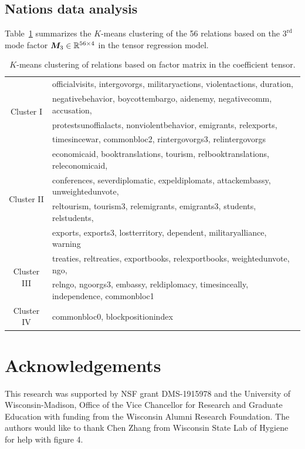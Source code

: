 \documentclass[12pt]{article}
\theoremstyle{plain}
\theoremstyle{definition}
\begin{document}
\subsection{Nations data analysis}
Table~\ref{tab:s1} summarizes the $K$-means clustering of the 56 relations based on the $3^{\text{rd}}$ mode factor $\bm M_3\in\mathbb{R}^{56\times 4}$ in the tensor regression model. 

\begin{table}[H]
\begin{tabular}{c|l}
\hline
\multirow{4}{*}{Cluster I}  &officialvisits, intergovorgs,  militaryactions, violentactions, duration, \\
&negativebehavior, boycottembargo, aidenemy, negativecomm, accusation, \\
& protestsunoffialacts,    nonviolentbehavior, emigrants, relexports,   \\
& timesincewar, commonbloc2, rintergovorgs3, relintergovorgs\\
\hline
\multirow{4}{*}{Cluster II}& economicaid, booktranslations, tourism, relbooktranslations, releconomicaid, \\
& conferences, severdiplomatic, expeldiplomats, attackembassy, unweightedunvote,\\
& reltourism, tourism3, relemigrants, emigrants3, students, relstudents, \\
&exports, exports3, lostterritory, dependent, militaryalliance, warning  \\
\hline
\multirow{2}{*}{Cluster III} & treaties, reltreaties, exportbooks, relexportbooks, weightedunvote, ngo, \\
&relngo, ngoorgs3, embassy, reldiplomacy, timesinceally, independence, commonbloc1\\
\hline
Cluster IV & commonbloc0, blockpositionindex\\
\end{tabular}
\caption{$K$-means clustering of relations based on factor matrix in the coefficient tensor.}\label{tab:s1}
\end{table}

\section*{Acknowledgements}
This research was supported by NSF grant DMS-1915978 and the University of Wisconsin-Madison, Office of the Vice Chancellor for Research and Graduate Education with funding from the Wisconsin Alumni Research Foundation. The authors would like to thank Chen Zhang from Wisconsin State Lab of Hygiene for help with figure 4. 



\end{document}
